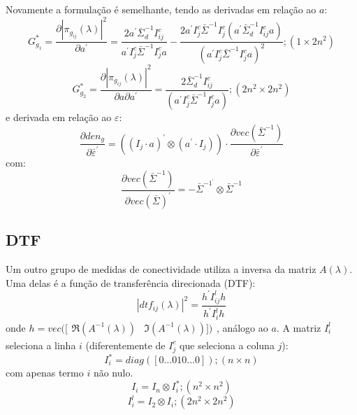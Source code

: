 \documentclass[a4paper,10pt]{article}
\begin{document}
Novamente a formulação é semelhante, tendo as derivadas em relação ao $a$:
\begin{equation}
G_{g_1}^{\ast} = \frac{\partial |\pi_{g_{ij}}(\lambda)|^{2}}{\partial a^{'}} = \frac{2 a^{'} \bar{\Sigma}_{d}^{-1} I_{ij}^{c}} {a^{'} I_{j}^{c} \bar{\Sigma}^{-1} I_{j}^{c} a} - \frac{2 a^{'} I_{j}^{c} \bar{\Sigma}^{-1} I_{j}^{c} (a^{'} \bar{\Sigma}_{d}^{-1} I_{ij}^{c} a)} {(a^{'} I_{j}^{c} \bar{\Sigma}^{-1} I_{j}^{c} a)^{2}}; (1 \times 2n^{2})
\end{equation}
\begin{equation}
G_{g_2}^{\ast} = \frac{\partial |\pi_{g_{ij}}(\lambda)|^{2}}{\partial a \partial a^{'}} = \frac{2 \bar{\Sigma}_{d}^{-1} I_{ij}^{c}}{(a^{'} I_{j}^{c} \bar{\Sigma}^{-1} I_{j}^{c} a)}; (2n^{2} \times 2n^{2})
\end{equation}
e derivada em relação ao $\varepsilon$:
\begin{equation}
\frac{\partial den_{g}}{\partial \bar{\varepsilon}^{'}} = ((I_{j} \cdot a)^{'} \otimes (a^{'} \cdot I_{j})) \cdot \frac{\partial vec(\bar{\Sigma}^{-1})}{\partial \bar{\varepsilon}^{'}}
\end{equation}
com:
\begin{equation}
\frac{\partial vec(\bar{\Sigma}^{-1})}{\partial vec(\bar{\Sigma})^{'}} = -\bar{\Sigma}^{-1^{'}} \otimes \bar{\Sigma}^{-1}
\end{equation}

\subsection{DTF}

Um outro grupo de medidas de conectividade utiliza a inversa da matriz $A(\lambda)$. Uma delas é a função de transferência direcionada (DTF):
\begin{equation}
 |dtf_{ij}(\lambda)|^{2} = \frac{h^{'} I_{ij}^{l} h}{h^{'} I_{i}^{l} h}
\end{equation}
onde $h = vec([\begin{array}{cc}\Re(A^{-1}(\lambda)) & \Im(A^{-1}(\lambda))])\end{array}$, análogo ao $a$. A matriz $I_{i}^{l}$ seleciona a linha $i$ (diferentemente de $I_{j}^{c}$ que seleciona a coluna $j$):
\begin{equation}
I_{i}^{\ast} = diag([0 \dots 0 1 0 \dots 0]); (n \times n)
\end{equation}
com apenas termo $i$ não nulo.
\begin{equation}
I_{i} = I_{n} \otimes I_{i}^{\ast}; (n^{2} \times n^{2})
\end{equation}
\begin{equation}
I_{i}^{l} = I_{2} \otimes I_{i}; (2n^{2} \times 2n^{2})
\end{equation}
\end{document}
